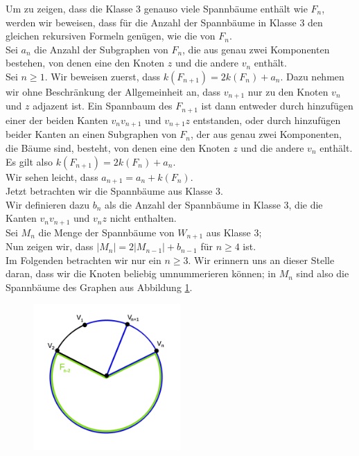 Um zu zeigen, dass die Klasse 3 genauso viele Spannbäume enthält wie $F_n$, werden wir beweisen, dass für die Anzahl der Spannbäume in Klasse 3 den gleichen rekursiven Formeln genügen, wie die von $F_n$.\\
Sei $a_n$ die Anzahl der Subgraphen von $F_n$, die aus genau zwei Komponenten bestehen, von denen eine den Knoten $z$ und die andere $v_n$ enthält.\\
Sei $n \geq 1$.
Wir beweisen zuerst, dass $\mathit{k}\left(F_{n+1}\right)=2\mathit{k}\left(F_{n}\right)+a_n$.
Dazu nehmen wir ohne Beschränkung der Allgemeinheit an, dass $v_{n+1}$ nur zu den Knoten $v_n$ und $z$ adjazent ist. Ein Spannbaum des $F_{n+1}$ ist dann entweder durch hinzufügen einer der beiden Kanten $v_nv_{n+1}$ und $v_{n+1}z$ entstanden, oder durch hinzufügen beider Kanten an einen Subgraphen von $F_n$, der aus genau zwei Komponenten, die Bäume sind, besteht, von denen eine den Knoten $z$ und die andere $v_n$ enthält.\\
Es gilt also $\mathit{k}\left(F_{n+1}\right)=2\mathit{k}\left(F_{n}\right)+a_n$.\\
Wir sehen leicht, dass $a_{n+1}=a_n+\mathit{k}\left(F_n\right)$.\\
Jetzt betrachten wir die Spannbäume aus Klasse 3.\\
Wir definieren dazu $b_n$ als die Anzahl der Spannbäume in Klasse 3, die die Kanten $v_nv_{n+1}$ und $v_{n}z$ nicht enthalten.\\
Sei $M_n$ die Menge der Spannbäume von $W_{n+1}$ aus Klasse 3;\\
Nun zeigen wir, dass $|M_{n}|=2|M_{n-1}|+b_{n-1}$ für $n \geq 4$ ist.\\
Im Folgenden betrachten wir nur ein $n \geq 3$. Wir erinnern uns an dieser Stelle daran, dass wir die Knoten beliebig umnummerieren können; in $M_{n}$ sind also die Spannbäume des Graphen aus Abbildung \ref{mn1}.
\begin{figure}[H]
  \centering
 \includegraphics[width=0.5\textwidth]{mn1.png}
 \caption{}
 \label{mn1} %
\end{figure}
